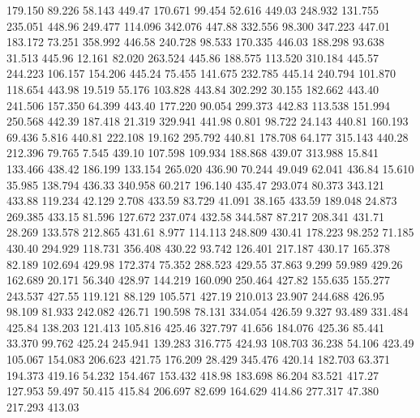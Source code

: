  179.150   89.226   58.143       449.47
 170.671   99.454   52.616       449.03
 248.932  131.755  235.051       448.96
 249.477  114.096  342.076       447.88
 332.556   98.300  347.223       447.01
 183.172   73.251  358.992       446.58
 240.728   98.533  170.335       446.03
 188.298   93.638   31.513       445.96
  12.161   82.020  263.524       445.86
 188.575  113.520  310.184       445.57
 244.223  106.157  154.206       445.24
  75.455  141.675  232.785       445.14
 240.794  101.870  118.654       443.98
  19.519   55.176  103.828       443.84
 302.292   30.155  182.662       443.40
 241.506  157.350   64.399       443.40
 177.220   90.054  299.373       442.83
 113.538  151.994  250.568       442.39
 187.418   21.319  329.941       441.98
   0.801   98.722   24.143       440.81
 160.193   69.436    5.816       440.81
 222.108   19.162  295.792       440.81
 178.708   64.177  315.143       440.28
 212.396   79.765    7.545       439.10
 107.598  109.934  188.868       439.07
 313.988   15.841  133.466       438.42
 186.199  133.154  265.020       436.90
  70.244   49.049   62.041       436.84
  15.610   35.985  138.794       436.33
 340.958   60.217  196.140       435.47
 293.074   80.373  343.121       433.88
 119.234   42.129    2.708       433.59
  83.729   41.091   38.165       433.59
 189.048   24.873  269.385       433.15
  81.596  127.672  237.074       432.58
 344.587   87.217  208.341       431.71
  28.269  133.578  212.865       431.61
   8.977  114.113  248.809       430.41
 178.223   98.252   71.185       430.40
 294.929  118.731  356.408       430.22
  93.742  126.401  217.187       430.17
 165.378   82.189  102.694       429.98
 172.374   75.352  288.523       429.55
  37.863    9.299   59.989       429.26
 162.689   20.171   56.340       428.97
 144.219  160.090  250.464       427.82
 155.635  155.277  243.537       427.55
 119.121   88.129  105.571       427.19
 210.013   23.907  244.688       426.95
  98.109   81.933  242.082       426.71
 190.598   78.131  334.054       426.59
   9.327   93.489  331.484       425.84
 138.203  121.413  105.816       425.46
 327.797   41.656  184.076       425.36
  85.441   33.370   99.762       425.24
 245.941  139.283  316.775       424.93
 108.703   36.238   54.106       423.49
 105.067  154.083  206.623       421.75
 176.209   28.429  345.476       420.14
 182.703   63.371  194.373       419.16
  54.232  154.467  153.432       418.98
 183.698   86.204   83.521       417.27
 127.953   59.497   50.415       415.84
 206.697   82.699  164.629       414.86
 277.317   47.380  217.293       413.03
